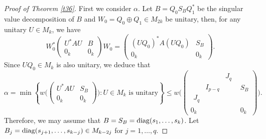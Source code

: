 \documentclass[11pt]{article}
\numberwithin{equation}{section}
\def\diag{{\rm diag}}
\begin{document}
\begin{proof}[Proof of Theorem \ref{t36}]
 First we consider $\alpha$.
Let $B=Q_0S_BQ_1^*$ be the singular value decomposition of $B$ and $W_0=Q_0\oplus Q_1\in M_{2k}$ be unitary, then, for any unitary $U\in M_k$, we have
$$W_0^*\begin{pmatrix} U^*AU & B\\ 0_k & 0_k\end{pmatrix}W_0=\begin{pmatrix} (UQ_0)^*A(UQ_0) & S_B\\ 0_k & 0_k\end{pmatrix}.$$
Since $UQ_0\in M_k$ is also unitary, we deduce that
\begin{equation}\label{eq3}
\alpha=\min\left\{w\Big(\begin{pmatrix} U^*AU & S_B\\ 0_k & 0_k\end{pmatrix}\Big) : U\in M_k \mbox{ is unitary}\right\}\le
w\Big(\left(\begin{array}{c|c}\begin{array}{ccc}  & & J_q\\ & I_{p-q} & \\ J_q & & \end{array} & S_B
\\ \hline 0_k & 0_k\end{array}\right)\Big).
\end{equation}
Therefore, we may assume that $B=S_B=\diag(s_1, \dots, s_k)$. Let $B_j=\diag(s_{j+1}, \dots, s_{k-j})\in M_{k-2j}$ for $j=1, \dots, q$.


\end{proof}
\end{document}
